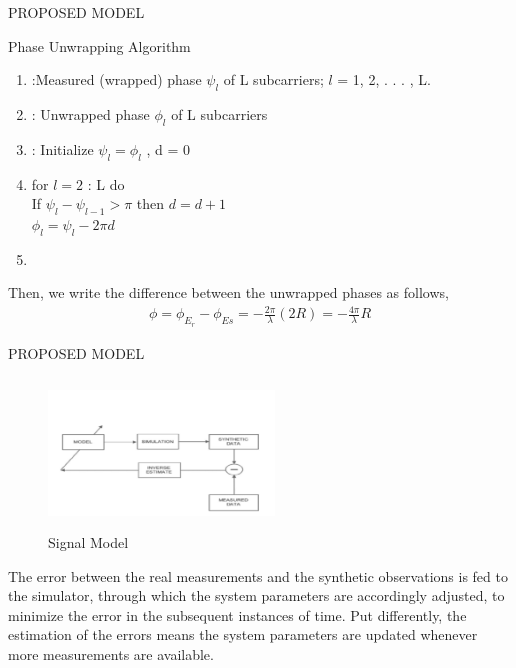 \documentclass{beamer}
\begin{document}
\begin{frame}{PROPOSED MODEL}
\begin{block}{Phase Unwrapping Algorithm}
\begin{enumerate}
    \item {}:Measured (wrapped) phase $\psi_l$ of L
subcarriers; $l$ = 1, 2, . . . , L.
\item {} : Unwrapped phase $\phi_l$ of L subcarriers
\item {} : Initialize $\psi_l=\phi_l$
, d = 0
\item for $l=2$ : L do\\
      If  $\psi_l-\psi_{l-1}> \pi$ then $d=d+1$\\
      $\phi_l=\psi_l-2\pi d$
      \item {}
\end{enumerate}

\end{block}
Then, we write the
difference between the unwrapped phases as follows,
\begin{align}
     \phi = \phi_{E_{r}} - \phi_{E{s}} = -\frac{2\pi}{\lambda}(2R) = -\frac{4\pi}{\lambda}R
\end{align}
\end{frame}
\begin{frame}{PROPOSED MODEL}
\begin{figure}[h]
    \centering
    \includegraphics[width=6cm, height=4cm]{Figure.jpeg}
    \caption{Signal Model}
    \label{fig:Result4}
\end{figure}
 The error between
the real measurements and the synthetic observations is fed
to the simulator, through which the system parameters are
accordingly adjusted, to minimize the error in the subsequent
instances of time. Put differently, the estimation of the errors
means the system parameters are updated whenever more
measurements are available.

 
\end{frame}
\end{document}
